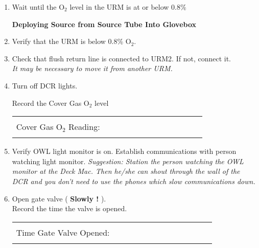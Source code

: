 \begin{enumerate}
\item \checkbox Wait until the O$_2$ level in the URM is at or below 0.8\%


\begin{center}
            {\bf Deploying Source from Source Tube Into Glovebox}
\end{center}

 \item\checkbox Verify that the URM is below 0.8\% O$_2$.


\item\checkbox Check that flush return line is connected to
  URM2.  If not, connect it.\\
  \small
  {\em It may be necessary to move it from another URM.
  }
  \normalsize


 \item\checkbox Turn off DCR lights.

 \checkitem Record the Cover Gas O$_2$ level
     \begin{center}
     \begin{tabular}{|l|}
     \hline
      \\
      Cover Gas O$_2$ Reading:~~~~~~~~~~~~~~~~~~~~~~~~\\
      \\
     \hline
     \end{tabular}
     \end{center}

 \item\checkbox Verify OWL light monitor is on.  Establish communications
  with person watching light monitor.
  \small
  {\em
    Suggestion:  Station the person watching the OWL monitor at
    the Deck Mac.  Then he/she can shout through the  wall of the
    DCR and you don't need to use the phones which slow communications
    down.
  }
  \normalsize


\item\checkbox Open gate valve ( {\bf Slowly !} ).\\
  Record the time the valve is opened.
     \begin{center}
     \begin{tabular}{|l|}
     \hline
      \\
     Time Gate Valve Opened:~~~~~~~~~~~~~~~~~~~~~~~~\\
      \\
     \hline
     \end{tabular}
     \end{center}


\end{enumerate}
